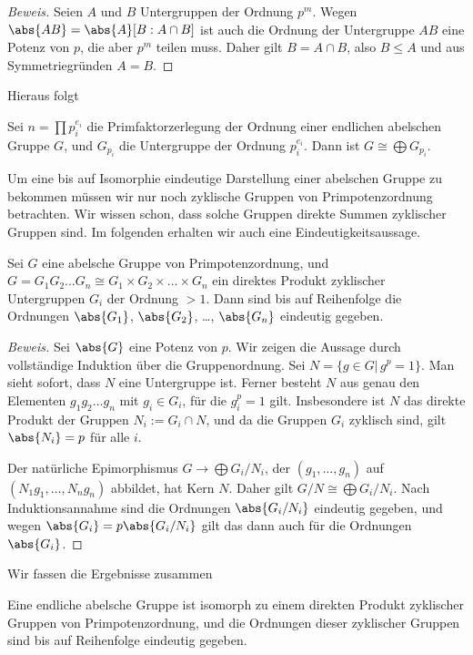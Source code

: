 \documentclass[12pt,a4paper,twoside]{article}
\begin{document}
\begin{proof}[Beweis]
  Seien $A$ und $B$ Untergruppen der Ordnung $p^m$. Wegen
  $\abs{AB}=\abs{A}[B:A\cap B]$ ist auch die Ordnung der Untergruppe $AB$ eine
  Potenz von $p$, die aber $p^m$ teilen muss. Daher gilt $B=A\cap B$, also
  $B\le A$ und aus Symmetriegr\"unden $A=B$.
\end{proof}
Hieraus folgt
\begin{Lemma}
  Sei $n=\prod p_i^{e_i}$ die Primfaktorzerlegung der Ordnung einer endlichen
  abelschen Gruppe $G$, und $G_{p_i}$ die Untergruppe der Ordnung
  $p_i^{e_i}$. Dann ist $G\cong\bigoplus G_{p_i}$.
\end{Lemma}
Um eine bis auf Isomorphie eindeutige Darstellung einer abelschen Gruppe zu
bekommen m\"ussen wir nur noch zyklische Gruppen von Primpotenzordnung
betrachten. Wir wissen schon, dass solche Gruppen direkte Summen zyklischer
Gruppen sind. Im folgenden erhalten wir auch eine Eindeutigkeitsaussage.
\begin{Lemma}
  Sei $G$ eine abelsche Gruppe von Primpotenzordnung, und $G=G_1G_2\dots
  G_n\cong G_1\times G_2\times\dots\times G_n$ ein direktes Produkt zyklischer
  Untergruppen $G_i$ der Ordnung $>1$. Dann sind bis auf Reihenfolge die
  Ordnungen $\abs{G_1}$, $\abs{G_2}$, \dots, $\abs{G_n}$ eindeutig gegeben.
\end{Lemma}
\begin{proof}[Beweis]
  Sei $\abs{G}$ eine Potenz von $p$. Wir zeigen die Aussage durch
  vollst\"andige Induktion \"uber die Gruppenordnung. Sei $N=\{g\in
  G|\,g^p=1\}$. Man sieht sofort, dass $N$ eine Untergruppe ist. Ferner
  besteht $N$ aus genau den Elementen $g_1g_2\dots g_n$ mit $g_i\in G_i$,
  f\"ur die $g_i^p=1$ gilt. Insbesondere ist $N$ das direkte Produkt der
  Gruppen $N_i:=G_i\cap N$, und da die Gruppen $G_i$ zyklisch sind, gilt
  $\abs{N_i}=p$ f\"ur alle $i$.
  
  Der nat\"urliche Epimorphismus $G\to\bigoplus G_i/N_i$, der
  $(g_1,\dots,g_n)$ auf $(N_1g_1,\dots,N_ng_n)$ abbildet, hat Kern $N$. Daher
  gilt $G/N\cong\bigoplus G_i/N_i$. Nach Induktionsannahme sind die Ordnungen
  $\abs{G_i/N_i}$ eindeutig gegeben, und wegen $\abs{G_i}=p\abs{G_i/N_i}$ gilt
  das dann auch f\"ur die Ordnungen $\abs{G_i}$.
\end{proof}
Wir fassen die Ergebnisse zusammen
\begin{Satz}
  Eine endliche abelsche Gruppe ist isomorph zu einem direkten Produkt
  zyklischer Gruppen von Primpotenzordnung, und die Ordnungen dieser
  zyklischer Gruppen sind bis auf Reihenfolge eindeutig gegeben.
\end{Satz}
\end{document}
